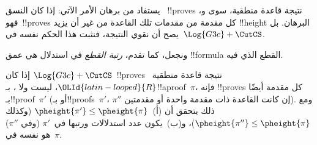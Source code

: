 \documentclass[../../../include/open-logic-section]{subfiles}
\begin{document}


يستفاد من برهان  الأمر الآتي: إذا كان
النسق ~!!{prove}s نتيجة قاعدة منطقية، سوى
\RightR{\lexists} و\LeftR{\lforall}، فهو~!!{prove}s كل مقدمة من مقدمات
تلك القاعدة من غير أن يزيد !!{height} البرهان. بل يصح أن نقوي النتيجة،
فنثبت هذا الحكم نفسه في~$\Log{G3c} + \CutCS$.

ونجعل، كما تقدم، \emph{رتبة القطع} في استدلال \CutCS{} هي عمق
!!{formula} القطع الذي فيه.

\begin{lem}
إذا كان $\Log{G3c} + \CutCS$~!!{prove}s نتيجة قاعدة منطقية~${\OLId{latin-looped}{R}}$، ليست
\RightR{\lexists} ولا \LeftR{\lforall}، بـ!!a{proof}~$\pi$، فإنه
!!{prove}s كل مقدمة أيضًا بـ!!{proof}~$\pi'$ (أو بـ!!{proof}s~$\pi'$،
$\pi''$ إن كانت القاعدة ذات مقدمة واحدة أو مقدمتين). ومع ذلك يتحقق أن
(أ)~$\pheight{\pi'}\le\pheight{\pi}$ (وكذلك
$\pheight{\pi''}\le\pheight{\pi}$)، و(ب)~يكون عدد استدلالات \CutCS{}
ورتبها في~$\pi'$ (وفي $\pi''$) هو نفسه في~$\pi$.
\end{lem}
\end{document}
